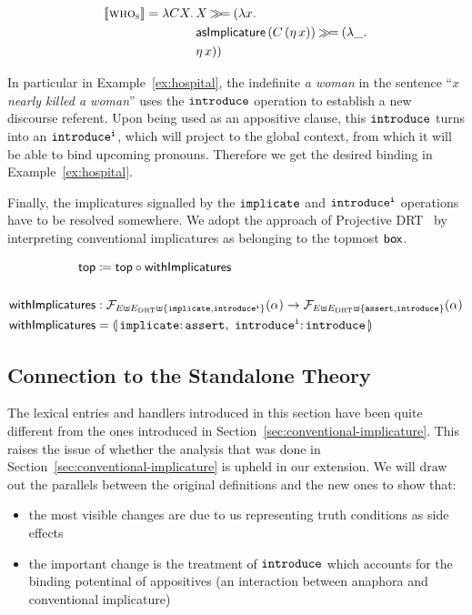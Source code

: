 $$
\llbracket \textsc{who}_{\textsc{s}} \rrbracket = \lambda C X.\, \begin{aligned}[t]
    &X \mathbin{\gg\!=} (\lambda x.\,  \\
    &\textsf{asImplicature}\,(C\,(\eta\,x)) \mathbin{\gg\!=} (\lambda \_.\,  \\
    &\eta\,x))
  \end{aligned}
$$

In particular in Example~\ref{ex:hospital}, the indefinite \emph{a woman}
in the sentence ``\emph{$x$ nearly killed a woman}'' uses the
$\mathtt{introduce}$ operation to establish a new discourse referent. Upon
being used as an appositive clause, this $\mathtt{introduce}$ turns into an
$\mathtt{introduce^i}$, which will project to the global context, from which it
will be able to bind upcoming pronouns. Therefore we get the desired
binding in Example~\ref{ex:hospital}.

Finally, the implicatures signalled by the $\mathtt{implicate}$ and
$\mathtt{introduce^i}$ operations have to be resolved somewhere. We adopt the
approach of Projective DRT~\cite{venhuizen2013parsimonious} by interpreting
conventional implicatures as belonging to the topmost $\textsf{box}$.

\begin{align*}
  \TOP &\coloneqq \TOP \circ \withImplicatures \\
  \\
  \withImplicatures &: \FF_{E \uplus E_\DRT \uplus \{\op{implicate},\op{introduce^i}\}}(\alpha) \to
                       \FF_{E \uplus E_\DRT \uplus \{\op{assert},\op{introduce}\}}(\alpha) \\
  \withImplicatures &= \banana{\onto{\op{implicate}}{\op{assert}},\
                               \onto{\op{introduce^i}}{\op{introduce}}}
\end{align*}


\subsection{Connection to the Standalone Theory}

The lexical entries and handlers introduced in this section have been quite
different from the ones introduced in
Section~\ref{sec:conventional-implicature}. This raises the issue of
whether the analysis that was done in
Section~\ref{sec:conventional-implicature} is upheld in our extension. We
will draw out the parallels between the original definitions and the new
ones to show that:

\begin{itemize}
\item the most visible changes are due to us representing truth conditions
  as side effects
\item the important change is the treatment of $\mathtt{introduce}$ which
  accounts for the binding potentinal of appositives (an interaction
  between anaphora and conventional implicature)
\end{itemize}

